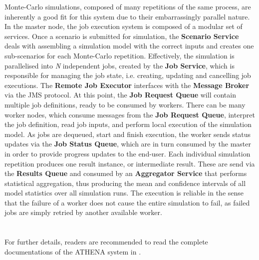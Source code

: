 Monte-Carlo simulations, composed of many repetitions of the same process, are inherently a good fit for this system due to their embarrassingly parallel nature. 
In the master node, the job execution system is composed of a modular set of services. Once a scenario is submitted for simulation, the \textbf{Scenario Service} deals with assembling a simulation model with the correct inputs and creates one sub-scenarios for each Monte-Carlo repetition. Effectively, the simulation is parallelised into \textit{N} independent jobs, created by the \textbf{Job Service}, which is responsible for managing the job state, i.e. creating, updating and cancelling job executions. The \textbf{Remote Job Executor} interfaces with the \textbf{Message Broker} via the JMS protocol. At this point, the \textbf{Job Request Queue} will contain multiple job definitions, ready to be consumed by workers. 
There can be many worker nodes, which consume messages from the \textbf{Job Request Queue}, interpret the job definition, read job inputs, and perform local execution of the simulation model. As jobs are dequeued, start and finish execution, the worker sends status updates via the \textbf{Job Status Queue}, which are in turn consumed by the master in order to provide progress updates to the end-user. Each individual simulation repetition produces one result instance, or intermediate result. These are send via the \textbf{Results Queue} and consumed by an \textbf{Aggregator Service} that performs statistical aggregation, thus producing the mean and confidence intervals of all model statistics over all simulation runs. The execution is reliable in the sense that the failure of a worker does not cause the entire simulation to fail, as failed jobs are simply retried by another available worker. 
\\
\\
\\
For further details, readers are recommended to read the complete documentations of the ATHENA system in \parencite{athenaAllDoc}.
